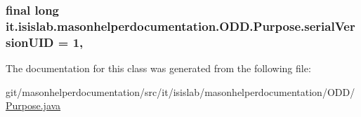 \hypertarget{classit_1_1isislab_1_1masonhelperdocumentation_1_1_o_d_d_1_1_purpose_a87ffe58f2db7565aeb8cb62e2ba7beb6}{
\subsubsection[{serial\-Version\-U\-I\-D}]{\setlength{\rightskip}{0pt plus 5cm}final long it.\-isislab.\-masonhelperdocumentation.\-O\-D\-D.\-Purpose.\-serial\-Version\-U\-I\-D = 1\hspace{0.3cm}{\ttfamily [static]}, {\ttfamily [private]}}}\label{classit_1_1isislab_1_1masonhelperdocumentation_1_1_o_d_d_1_1_purpose_a87ffe58f2db7565aeb8cb62e2ba7beb6}


The documentation for this class was generated from the following file\-:\begin{DoxyCompactItemize}
\item 
git/masonhelperdocumentation/src/it/isislab/masonhelperdocumentation/\-O\-D\-D/\hyperlink{_purpose_8java}{Purpose.\-java}\end{DoxyCompactItemize}

